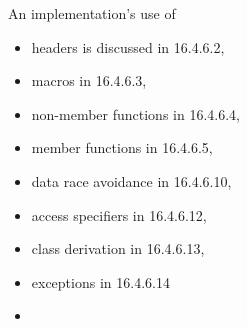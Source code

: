 \begin{modification}
An implementation’s use of

\begin{itemize}[label=\textemdash]

\item
headers is discussed in 16.4.6.2,

\item
macros in 16.4.6.3,

\item
non-member functions in 16.4.6.4,

\item
member functions in 16.4.6.5,

\item
data race avoidance in 16.4.6.10,

\item
access specifiers in 16.4.6.12,

\item
class derivation in 16.4.6.13, 

\item
exceptions in 16.4.6.14 

\item
{}

\end{itemize}

\end{modification}

\begin{removal}
\end{removal}
